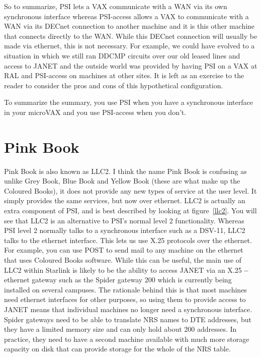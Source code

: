 So to summarize, PSI lets a VAX communicate with a WAN via
its own synchronous interface whereas PSI-access allows a VAX to
communicate with a WAN via its DECnet connection to another machine and it
is this other machine that connects directly to the WAN. While this DECnet
connection will usually be made via ethernet, this is not necessary. For
example, we could have evolved to a situation in which we still ran DDCMP
circuits over our old leased lines and access to JANET and the outside
world was provided by having PSI on a VAX at RAL and PSI-access on
machines at other sites. It is left as an exercise to the reader to
consider the pros and cons of this hypothetical configuration.

To summarize the summary, you use PSI when you have a synchronous interface in
your microVAX and you use PSI-access when you don't.

\section{Pink Book}

Pink Book is also known as LLC2. I think the name Pink Book is confusing as
unlike Grey Book, Blue Book and Yellow Book (these are what make up the
Coloured Books), it does not provide any new types of service at the user
level. It simply provides the same services, but now over ethernet. LLC2 is
actually an extra component of PSI, and is best described by looking at
figure~\ref{llc2}. You will see that LLC2 is an alternative to PSI's normal
level 2 functionality. Whereas PSI level 2 normally talks to a synchronous
interface such as a DSV-11, LLC2 talks to the ethernet interface. This lets us
use X.25 protocols over the ethernet. For example, you can use POST to send
mail to any machine on the ethernet that uses Coloured Books software. While
this can be useful, the main use of LLC2 within Starlink is likely to be the
ability to access JANET via an X.25 {\bf--} ethernet gateway such as the Spider
gateway 200 which is currently being installed on several campuses. The
rationale behind this is that most machines need ethernet interfaces for other
purposes, so using them to provide access to JANET means that individual
machines no longer need a synchronous interface. Spider gateways need to be
able to translate NRS names to DTE addresses, but they have a limited memory
size and can only hold about 200 addresses. In practice, they need to have a
second machine available with much more storage capacity on disk that can
provide storage for the whole of the NRS table.

